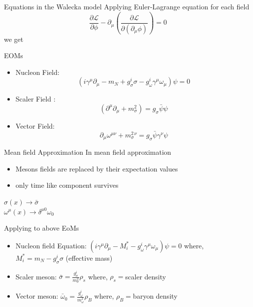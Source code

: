 \documentclass[12pt,aspectratio169]{beamer}
\begin{document}
\begin{frame}{Equations in the Walecka model}
    Applying Euler-Lagrange equation for each field
   $$
\frac{\partial \mathcal{L}}{\partial \phi}-\partial_\mu\left(\frac{\partial \mathcal{L}}{\partial\left(\partial_\mu \phi\right)}\right)=0
$$
we get
\begin{block}{EOMs}
    \begin{itemize}
        \item Nucleon Field: $$
\left(i \gamma^\mu \partial_\mu-m_N+g_\sigma^i \sigma-g_\omega^i \gamma^\mu \omega_\mu\right) \psi=0
$$
        \item Scaler Field :$$
\left(\partial^\mu \partial_\mu+m_\sigma^2\right) \mathscr{}=g_\sigma \bar{\psi} \psi
$$
        \item Vector Field:$$ \partial_\mu \omega^{\mu\nu} +m^2_\sigma^\nu = g_\sigma \bar{\psi} \gamma^\nu \psi $$
    \end{itemize}
\end{block}
\end{frame}
\begin{frame}{Mean field Approximation}
    In mean field approximation
    \begin{itemize}
        \item Mesons fields are replaced by their expectation values
        \item only time like component survives
    \end{itemize}
    \begin{block}{}
       $\sigma(x) \longrightarrow \bar{\sigma}$\\
       $\omega^\mu (x) \longrightarrow \delta^{\mu0}\omega_0$
 
    \end{block}
    Applying to above EoMs
    \begin{block}{}
        \begin{itemize}
            \item Nucleon field Equation: $\left(i \gamma^\mu \partial_\mu-M^*_i-g_\omega^i \gamma^\mu \omega_\mu\right) \psi=0$ where, $M^*_i =m_N-g_\sigma^i \sigma$ (effective mass)
            \item Scaler meson: $\bar{\sigma} =\frac{g^i_\sigma}{m^2_\sigma}\rho_s$ where, $\rho_s = $scaler density
            \item Vector meson: $\bar{\omega}_0 = \frac{g^i_\omega}{m^2_\omega}\rho_B $ where, $\rho_B=$baryon density
        \end{itemize}
    \end{block}
\end{frame}
\end{document}
